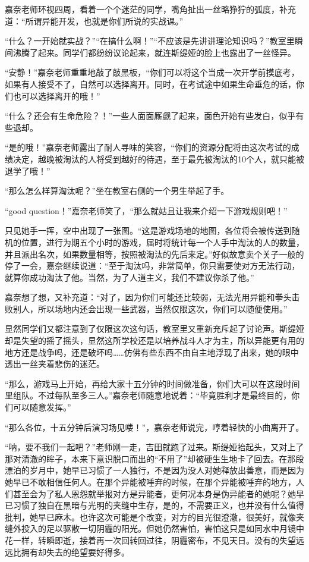 \documentclass[a5paper, punct=kaiming, fontset=founder]{ctexart}
\begin{document}
嘉奈老师环视四周，看着一个个迷茫的同学，嘴角扯出一丝略狰狞的弧度，补充道：“所谓异能开发，也就是你们所说的实战课。”

“什么？一开始就实战？”“在搞什么啊！”“不应该是先讲讲理论知识吗？”教室里瞬间沸腾了起来。同学们都纷纷议论起来，就连斯缇娅的脸上也露出了一丝怪异。

“安静！”嘉奈老师重重地敲了敲黑板，“你们可以将这个当成一次开学前摸底考，如果有人接受不了，自然可以选择离开。同时，在考试途中如果生命垂危的话，你们也可以选择离开的哦！”

“什么？还会有生命危险？！”一些人面面厮觑了起来，面色开始有些发白，似乎有些退却。

“是的哦！”嘉奈老师露出了耐人寻味的笑容，“你们的资源分配将由这次考试的成绩决定，越晚被淘汰的人将受到越好的待遇，至于最先被淘汰的10个人，就只能被退学了哦！”

“那么怎么样算淘汰呢？”坐在教室右侧的一个男生举起了手。

“good question！”嘉奈老师笑了，“那么就姑且让我来介绍一下游戏规则吧！”

只见她手一挥，空中出现了一张图。“这是游戏场地的地图，各位将会被传送到随机的位置，进行为期五个小时的游戏，届时将统计每一个人手中淘汰的人的数量，并且派出名次，如果数量相等，按照被淘汰的先后来定。”好似故意卖个关子一般的停了一会，嘉奈继续说道：“至于淘汰吗，非常简单，你只需要使对方无法行动，就算你成功淘汰了他。当然，为了人道主义，我们不建议你杀了他。”

嘉奈想了想，又补充道：“对了，因为你们可能还比较弱，无法光用异能和拳头击败别人，所以场地内还会出现一些武器，当然仅限这次，你们可以随便使用。”

显然同学们又都注意到了仅限这次这句话，教室里又重新充斥起了讨论声。斯缇娅却是失望的摇了摇头，显然这所学校还是以培养战斗人才为主，所以异能更有用的地方还是战争吗，还是破坏吗……仿佛有些东西不由自主地浮现了出来，她的眼中透出一丝夹着悲伤的迷茫。

“那么，游戏马上开始，再给大家十五分钟的时间做准备，你们大可以在这段时间里组队。不过每队至多三人。”嘉奈老师随意地说着：“毕竟胜利才是最终目的，你们可以随意发挥。”

“那么各位，十五分钟后演习场见喽！”，嘉奈老师说完，哼着轻快的小曲离开了。

“呐，要不我们一起吧？”老师刚一走，吉田就跑了过来。斯缇娅抬起头，又对上了那对清澈的眸子，本来下意识脱口而出的“不用了”却被硬生生地卡了回去。在那段漂泊的岁月中，她早已习惯了一人独行，不是因为没人对她释放出善意，而是因为她早已不敢相信任何人。在那个异能被唾弃的时候，在那个异能被唾弃的地方，人们甚至会为了私人恩怨就举报对方是异能者，更何况本身是伪异能者的她呢？她早已习惯了独自在黑暗与光明的夹缝中生存，是的，不需要正义，也并没有什么值得批判，她早已麻木。也许这次可能是个改变，对方的目光很澄澈，很美好，就像夹缝外投入的足以驱散一切阴霾的阳光。但她仍然害怕，害怕这只是如同水中月镜中花一样，转瞬即逝，接着再一次回转回过往，阴霾密布，不见天日。没有的失望远远比拥有却失去的绝望要好得多。
\end{document}
